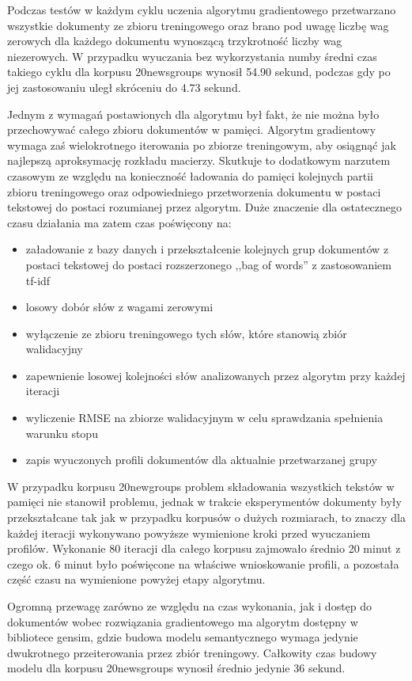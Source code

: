 \documentclass{pracamgr}
\begin{document}
Podczas testów w każdym cyklu uczenia algorytmu gradientowego przetwarzano wszystkie dokumenty ze zbioru treningowego oraz brano pod uwagę liczbę wag zerowych dla każdego dokumentu wynoszącą trzykrotność liczby wag niezerowych. W przypadku wyuczania bez wykorzystania numby średni czas takiego cyklu dla korpusu 20newsgroups wynosił 54.90 sekund, podczas gdy po jej zastosowaniu uległ skróceniu do 4.73 sekund.

Jednym z wymagań postawionych dla algorytmu był fakt, że nie można było przechowywać całego zbioru dokumentów w pamięci. Algorytm gradientowy wymaga zaś wielokrotnego iterowania po zbiorze treningowym, aby osiągnąć jak najlepszą aproksymację rozkładu macierzy. Skutkuje to dodatkowym narzutem czasowym ze względu na konieczność ładowania do pamięci kolejnych partii zbioru treningowego oraz odpowiedniego przetworzenia dokumentu w postaci tekstowej do postaci rozumianej przez algorytm. Duże znaczenie dla ostatecznego czasu działania ma zatem czas poświęcony na:

\begin{itemize}
    \item załadowanie z bazy danych i przekształcenie kolejnych grup dokumentów z postaci tekstowej do postaci rozszerzonego ,,bag of words'' z zastosowaniem tf-idf
    \item losowy dobór słów z wagami zerowymi
    \item wyłączenie ze zbioru treningowego tych słów, które stanowią zbiór walidacyjny
    \item zapewnienie losowej kolejności słów analizowanych przez algorytm przy każdej iteracji
    \item wyliczenie RMSE na zbiorze walidacyjnym w celu sprawdzania spełnienia warunku stopu
    \item zapis wyuczonych profili dokumentów dla aktualnie przetwarzanej grupy
\end{itemize}

W przypadku korpusu 20newgroups problem składowania wszystkich tekstów w pamięci nie stanowił problemu, jednak w trakcie eksperymentów dokumenty były przekształcane tak jak w przypadku korpusów o dużych rozmiarach, to znaczy dla każdej iteracji wykonywano powyższe wymienione kroki przed wyuczaniem profilów. Wykonanie 80 iteracji dla całego korpusu zajmowało średnio 20 minut z czego ok. 6 minut było poświęcone na właściwe wnioskowanie profili, a pozostała część czasu na wymienione powyżej etapy algorytmu.

Ogromną przewagę zarówno ze względu na czas wykonania, jak i dostęp do dokumentów wobec rozwiązania gradientowego ma algorytm dostępny w bibliotece gensim, gdzie budowa modelu semantycznego wymaga jedynie dwukrotnego przeiterowania przez zbiór treningowy. Całkowity czas budowy modelu dla korpusu 20newsgroups wynosił średnio jedynie 36 sekund.
\end{document}
